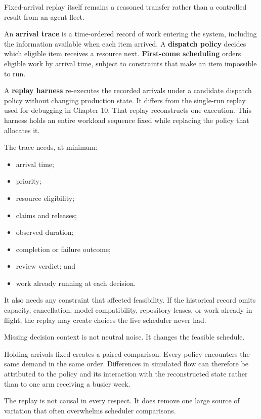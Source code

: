 Fixed-arrival replay itself remains a reasoned transfer rather than a controlled result from an agent fleet.

An \textbf{arrival trace} is a time-ordered record of work entering the system, including the information available when each item arrived. A \textbf{dispatch policy} decides which eligible item receives a resource next. \textbf{First-come scheduling} orders eligible work by arrival time, subject to constraints that make an item impossible to run.

A \textbf{replay harness} re-executes the recorded arrivals under a candidate dispatch policy without changing production state. It differs from the single-run replay used for debugging in Chapter 10. That replay reconstructs one execution. This harness holds an entire workload sequence fixed while replacing the policy that allocates it.


The trace needs, at minimum:

\begin{itemize}
\tightlist
\item
  arrival time;
\item
  priority;
\item
  resource eligibility;
\item
  claims and releases;
\item
  observed duration;
\item
  completion or failure outcome;
\item
  review verdict; and
\item
  work already running at each decision.
\end{itemize}

It also needs any constraint that affected feasibility. If the historical record omits capacity, cancellation, model compatibility, repository leases, or work already in flight, the replay may create choices the live scheduler never had.

Missing decision context is not neutral noise. It changes the feasible schedule.

Holding arrivals fixed creates a paired comparison. Every policy encounters the same demand in the same order. Differences in simulated flow can therefore be attributed to the policy and its interaction with the reconstructed state rather than to one arm receiving a busier week.

The replay is not causal in every respect. It does remove one large source of variation that often overwhelms scheduler comparisons.

